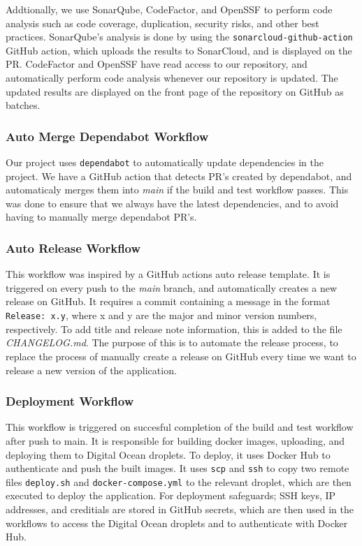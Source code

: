 Addtionally, we use SonarQube, CodeFactor, and OpenSSF to perform code analysis 
such as code coverage, duplication, security risks, and other best practices.
SonarQube's analysis is done by using the \texttt{sonarcloud-github-action} 
GitHub action, which uploads the results to SonarCloud, and is displayed on the PR.
CodeFactor and OpenSSF have read access to our repository, and automatically 
perform code analysis whenever our repository is updated.
The updated results are displayed on the front page of the repository on GitHub as batches.

\subsubsection{Auto Merge Dependabot Workflow}
Our project uses \texttt{dependabot} to automatically update dependencies in the project.
We have a GitHub action that detects PR's created by dependabot, and automaticaly merges 
them into \textit{main} if the build and test workflow passes.
This was done to ensure that we always have the latest dependencies,
and to avoid having to manually merge dependabot PR's.

\subsubsection{Auto Release Workflow}
This workflow was inspired by a GitHub actions auto release template\cite{auto-release}.
It is triggered on every push to the \textit{main} branch, and automatically creates a new release on GitHub.
It requires a commit containing a message in the format \texttt{Release: x.y}, where x and y are the major and minor version numbers, respectively.
To add title and release note information, this is added to the file \textit{CHANGELOG.md}.
The purpose of this is to automate the release process, to replace the process of manually create a release on GitHub every time 
we want to release a new version of the application.

\subsubsection{Deployment Workflow}
This workflow is triggered on succesful completion of the build and test workflow after push to main.
It is responsible for building docker images, uploading, and deploying them to Digital Ocean droplets.
To deploy, it uses Docker Hub to authenticate and push the built images.
It uses \texttt{scp} and \texttt{ssh} to copy two remote files \texttt{deploy.sh} and \texttt{docker-compose.yml} to the relevant droplet,
which are then executed to deploy the application.
For deployment safeguards; SSH keys, IP addresses, and creditials are stored in GitHub secrets,
which are then used in the workflows to access the Digital Ocean droplets and to authenticate with Docker Hub.


